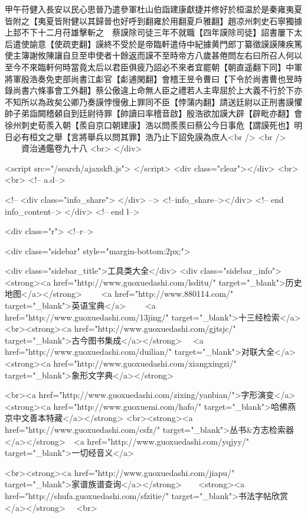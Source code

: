 甲午苻健入長安以民心思晉乃遣參軍杜山伯詣建康獻捷并修好於桓温於是秦雍夷夏皆附之【夷夏皆附健以其歸晉也好呼到翻雍於用翻夏戶雅翻】趙凉州刺史石寧獨據上邽不下十二月苻雄擊斬之　蔡謨除司徒三年不就職【四年謨除司徒】詔書屢下太后遣使諭意【使疏吏翻】謨終不受於是帝臨軒遣侍中紀據黄門郎丁纂徵謨謨陳疾篤使主簿謝攸陳讓自旦至申使者十餘返而謨不至時帝方八歲甚倦問左右曰所召人何以至今不來臨軒何時當竟太后以君臣俱疲乃詔必不來者宜罷朝【朝直遥翻下同】中軍將軍殷浩奏免吏部尚書江虨官【虨逋閑翻】會稽王昱令曹曰【下令於尚書曹也昱時錄尚書六條事會工外翻】蔡公傲違上命無人臣之禮若人主卑屈於上大義不行於下亦不知所以為政矣公卿乃奏謨悖慢傲上罪同不臣【悖蒲内翻】請送廷尉以正刑書謨懼帥子弟詣闕稽顙自到廷尉待罪【帥讀曰率稽音啟】殷浩欲加謨大辟【辟毗亦翻】會徐州刺史荀羨入朝【羨自京口朝建康】浩以問羨羨曰蔡公今日事危【謂謨死也】明日必有桓文之舉【言將舉兵以問其罪】浩乃止下詔免謨為庶人<br />
<br />
　　資治通鑑卷九十八  <br>
   </div> 

<script src="/search/ajaxskft.js"> </script>
 <div class="clear"></div>
<br>
<br>
 <!-- a.d-->

 <!--
<div class="info_share">
</div> 
-->
 <!--info_share--></div>   <!-- end info_content-->
  </div> <!-- end l-->

<div class="r">   <!--r-->



<div class="sidebar"  style="margin-bottom:2px;">

 
<div class="sidebar_title">工具类大全</div>
<div class="sidebar_info">
<strong><a href="http://www.guoxuedashi.com/lsditu/" target="_blank">历史地图</a></strong>　　
<a href="http://www.880114.com/" target="_blank">英语宝典</a>　　
<a href="http://www.guoxuedashi.com/13jing/" target="_blank">十三经检索</a>　
<br><strong><a href="http://www.guoxuedashi.com/gjtsjc/" target="_blank">古今图书集成</a></strong>　
<a href="http://www.guoxuedashi.com/duilian/" target="_blank">对联大全</a>　<strong><a href="http://www.guoxuedashi.com/xiangxingzi/" target="_blank">象形文字典</a></strong>　

<br><a href="http://www.guoxuedashi.com/zixing/yanbian/">字形演变</a>　　<strong><a href="http://www.guoxuemi.com/hafo/" target="_blank">哈佛燕京中文善本特藏</a></strong>
<br><strong><a href="http://www.guoxuedashi.com/csfz/" target="_blank">丛书&方志检索器</a></strong>　<a href="http://www.guoxuedashi.com/yqjyy/" target="_blank">一切经音义</a>　　

<br><strong><a href="http://www.guoxuedashi.com/jiapu/" target="_blank">家谱族谱查询</a></strong>　　<strong><a href="http://shufa.guoxuedashi.com/sfzitie/" target="_blank">书法字帖欣赏</a></strong>　
<br>

